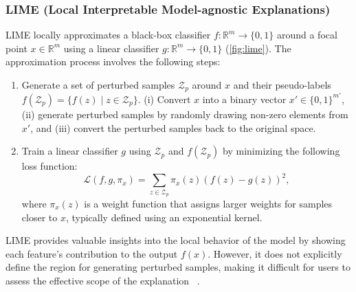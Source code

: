 \documentclass[runningheads]{llncs}
\begin{document}
\subsubsection[LIME]{%
  LIME (Local Interpretable Model-agnostic Explanations)~\cite{ribeiro2016why}
}
LIME locally
approximates a black-box classifier $f: \mathbb{R}^m \to \{0,1\}$
around a focal point $x \in \mathbb{R}^m$
using a linear classifier $g: \mathbb{R}^m \to \{0,1\}$
(\cref{fig:lime}).
The approximation process involves the following steps:
\begin{enumerate}
  \item Generate a set of perturbed samples $\mathcal{Z}_p$ around $x$
        and their pseudo-labels $f(\mathcal{Z}_p) = \{f(z) \mid z \in \mathcal{Z}_p\}$.
        (i) Convert $x$ into a binary vector $x'\in{\{0,1\}}^{m'}$,
        (ii) generate perturbed samples by randomly drawing non-zero elements
        from $x'$,
        and (iii) convert the perturbed samples back to the original space.
  \item Train a linear classifier $g$
        using $\mathcal{Z}_p$ and $f(\mathcal{Z}_p)$
        by minimizing the following loss function:
        \begin{equation}
          \mathcal{L}(f,g,\pi_x)=\sum_{z\in\mathcal{Z}_p}
          \pi_x(z){\left(f(z)-g(z)\right)}^2,
        \end{equation}
        where $\pi_x(z)$ is a weight function that assigns larger weights
        for samples closer to $x$, typically defined using an exponential kernel.
\end{enumerate}
LIME provides valuable insights into the local behavior of the model
by showing each feature's contribution to the output $f(x)$.
However, it does not explicitly define the region for generating perturbed samples,
making it difficult for users to assess the effective scope of the explanation
~\cite{ribeiro2018anchors}.
\end{document}
